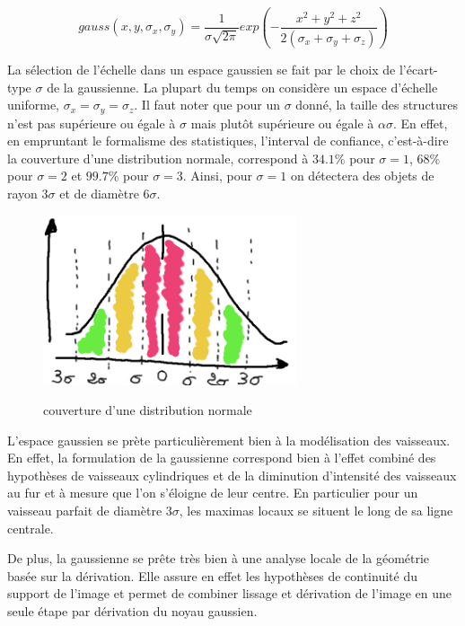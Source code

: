 \begin{equation}
  gauss(x,y,\sigma_{x},\sigma_{y}) = \frac{1}{ \sigma\sqrt{2\pi} }exp(-\frac{x^2 + y^2 + z^2}{2(\sigma_{x}+ \sigma_{y}+ \sigma_{z}) })
\end{equation}

La sélection de l'échelle dans un espace gaussien se fait par le choix de l'écart-type $\sigma$ de la gaussienne. La plupart du temps on considère un espace d'échelle uniforme, $\sigma_x = \sigma_y = \sigma_z$. Il faut noter que pour un $\sigma$ donné, la taille des structures n'est pas supérieure ou égale à $\sigma$ mais plutôt supérieure ou égale à $\alpha\sigma$. En effet, en empruntant le formalisme des statistiques, l'interval de confiance, c'est-à-dire la couverture d'une distribution normale, correspond à $34.1\%$ pour $\sigma=1$, $68\%$ pour $\sigma=2$ et $99.7\%$ pour $\sigma=3$. Ainsi, pour $\sigma=1$ on détectera des objets de rayon $3\sigma$ et de diamètre $6\sigma$.  

\begin{figure}
  \centering
  \includegraphics[height=5cm]{Images/normal_distribution_probability_coverage.png}
  \label{fig:normal_distribution_probability_coverage}
  \caption{couverture d'une distribution normale}
\end{figure}

L'espace gaussien se prète particulièrement bien à la modélisation des vaisseaux. En effet, la formulation de la gaussienne correspond bien à l'effet combiné des hypothèses de vaisseaux cylindriques et de la diminution d'intensité des vaisseaux au fur et à mesure que l'on s'éloigne de leur centre. En particulier pour un vaisseau parfait de diamètre $3\sigma$, les maximas locaux se situent le long de sa ligne centrale.

De plus, la gaussienne se prête très bien à une analyse locale de la géométrie basée sur la dérivation. Elle assure en effet les hypothèses de continuité du support de l'image et permet de combiner lissage et dérivation de l'image en une seule étape par dérivation du noyau gaussien.

